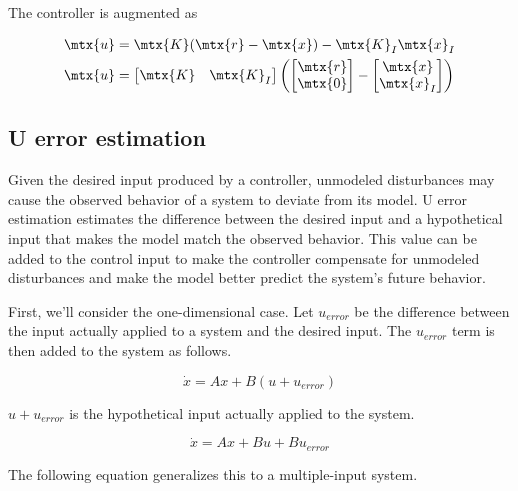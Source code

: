 The controller is augmented as

\begin{align*}
  \mtx{u} &= \mtx{K} (\mtx{r} - \mtx{x}) - \mtx{K}_I\mtx{x}_I \\
  \mtx{u} &=
  \begin{bmatrix}
    \mtx{K} & \mtx{K}_I
  \end{bmatrix}
  \left(\begin{bmatrix}
    \mtx{r} \\
    \mtx{0}
  \end{bmatrix} -
  \begin{bmatrix}
    \mtx{x} \\
    \mtx{x}_I
  \end{bmatrix}\right)
\end{align*}

\subsection{U error estimation}
\label{subsec:u_error_estimation}

Given the desired \gls{input} produced by a \gls{controller}, unmodeled
\glspl{disturbance} may cause the observed behavior of a \gls{system} to deviate
from its \gls{model}. U error estimation estimates the difference between the
desired \gls{input} and a hypothetical \gls{input} that makes the \gls{model}
match the observed behavior. This value can be added to the \gls{control input}
to make the \gls{controller} compensate for unmodeled \glspl{disturbance} and
make the \gls{model} better predict the \gls{system}'s future behavior.

First, we'll consider the one-dimensional case. Let $u_{error}$ be the
difference between the \gls{input} actually applied to a \gls{system} and the
desired \gls{input}. The $u_{error}$ term is then added to the \gls{system} as
follows.

\begin{equation*}
  \dot{x} = Ax + B\left(u + u_{error}\right)
\end{equation*}

$u + u_{error}$ is the hypothetical \gls{input} actually applied to the
\gls{system}.

\begin{equation*}
  \dot{x} = Ax + Bu + Bu_{error}
\end{equation*}

The following equation generalizes this to a multiple-input \gls{system}.

